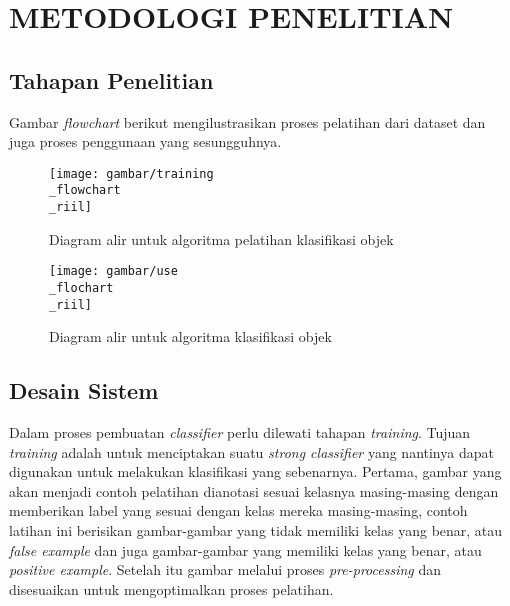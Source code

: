 
\chapter{METODOLOGI PENELITIAN}

\section{Tahapan Penelitian}

Gambar \textit{flowchart} berikut mengilustrasikan proses pelatihan 
 dari dataset dan juga proses penggunaan yang sesungguhnya.

\begin{figure}[H]
  \centering{}
	\texttt{[image: gambar/training\\\_flowchart\\\_riil]}
  \caption{Diagram alir untuk algoritma pelatihan klasifikasi objek}
\end{figure}

\begin{figure}[H]
  \centering{}
	\texttt{[image: gambar/use\\\_flochart\\\_riil]}
  \caption{Diagram alir untuk algoritma klasifikasi objek}
\end{figure}


\section{Desain Sistem}

Dalam proses pembuatan \emph{classifier} perlu dilewati tahapan \textit{training}. 
Tujuan \textit{training} adalah untuk menciptakan suatu \emph{strong classifier} 
yang nantinya dapat digunakan untuk melakukan klasifikasi yang sebenarnya.
Pertama, gambar yang akan menjadi contoh pelatihan dianotasi sesuai kelasnya masing-masing dengan 
memberikan label yang sesuai dengan kelas mereka masing-masing, 
contoh latihan ini berisikan gambar-gambar yang tidak memiliki kelas yang benar, atau 
\emph{false example} dan juga gambar-gambar yang memiliki kelas yang benar, atau 
\emph{positive example}. Setelah itu gambar melalui proses \emph{pre-processing} dan disesuaikan 
untuk mengoptimalkan proses pelatihan.

